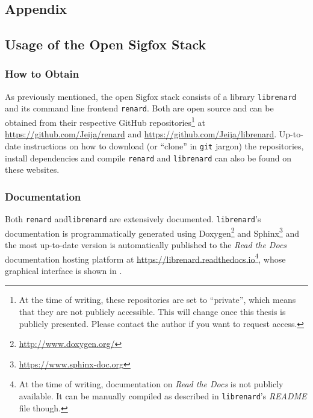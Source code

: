 \begin{appendix}
\chapter{Appendix}
\vspace{-0.2cm}
\section{Usage of the Open Sigfox Stack}
\vspace{-0.2cm}
\label{sec:renard_usage}
\subsection{How to Obtain}
\vspace{-0.2cm}
As previously mentioned, the open Sigfox stack consists of a library \texttt{librenard} and its command line frontend \texttt{renard}.
Both are open source and can be obtained from their respective GitHub repositories\footnote{\label{fn:repo_private_note}At the time of writing, these repositories are set to ``private'', which means that they are not publicly accessible. This will change once this thesis is publicly presented. Please contact the author if you want to request access.} at \url{https://github.com/Jeija/renard} and \url{https://github.com/Jeija/librenard}.
Up-to-date instructions on how to download (or ``clone'' in \texttt{git} jargon) the repositories, install dependencies and compile \texttt{renard} and \texttt{lib\-renard} can also be found on these websites.

\vspace{-0.2cm}
\subsection{Documentation}
\vspace{-0.2cm}
Both \texttt{renard} and\texttt{librenard} are extensively documented.
\texttt{librenard}'s documentation is programmatically generated using Doxygen\footnote{\url{http://www.doxygen.org/}} and Sphinx\footnote{\url{https://www.sphinx-doc.org}} and the most up-to-date version is automatically published to the \textit{Read the Docs} documentation hosting platform at \url{https://librenard.readthedocs.io}\footnote{At the time of writing, documentation on \textit{Read the Docs} is not publicly available. It can be manually compiled as described in \texttt{librenard}'s \textit{README} file though.}, whose graphical interface is shown in .


\end{appendix}
